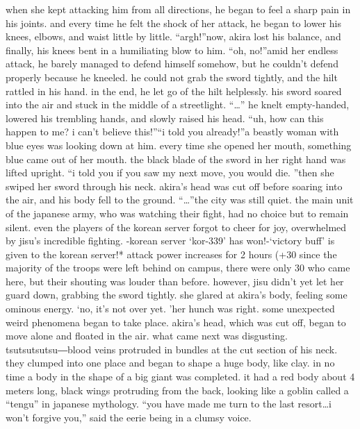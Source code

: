  when she kept attacking him from all directions, he began to feel a sharp pain in his joints.
and every time he felt the shock of her attack, he began to lower his knees, elbows, and waist little by little.
“argh!”now, akira lost his balance, and finally, his knees bent in a humiliating blow to him.
“oh, no!”amid her endless attack, he barely managed to defend himself somehow, but he couldn’t defend properly because he kneeled.
 he could not grab the sword tightly, and the hilt rattled in his hand.
in the end, he let go of the hilt helplessly.
 his sword soared into the air and stuck in the middle of a streetlight.
“…”
he knelt empty-handed, lowered his trembling hands, and slowly raised his head.
“uh, how can this happen to me? i can’t believe this!”“i told you already!”a beastly woman with blue eyes was looking down at him.
 every time she opened her mouth, something blue came out of her mouth.
 the black blade of the sword in her right hand was lifted upright.
“i told you if you saw my next move, you would die.
”then she swiped her sword through his neck.
akira’s head was cut off before soaring into the air, and his body fell to the ground.
“…”the city was still quiet.
 the main unit of the japanese army, who was watching their fight, had no choice but to remain silent.
even the players of the korean server forgot to cheer for joy, overwhelmed by jisu’s incredible fighting.
-korean server ‘kor-339’ has won!-‘victory buff’ is given to the korean server!* attack power increases for 2 hours (+30%
since the majority of the troops were left behind on campus, there were only 30 who came here, but their shouting was louder than before.
however, jisu didn’t yet let her guard down, grabbing the sword tightly.
she glared at akira’s body, feeling some ominous energy.
‘no, it’s not over yet.
’her hunch was right.
 some unexpected weird phenomena began to take place.
akira’s head, which was cut off, began to move alone and floated in the air.
what came next was disgusting.
tsutsutsutsu―blood veins protruded in bundles at the cut section of his neck.
 they clumped into one place and began to shape a huge body, like clay.
in no time a body in the shape of a big giant was completed.
it had a red body about 4 meters long, black wings protruding from the back, looking like a goblin called a “tengu” in japanese mythology.
“you have made me turn to the last resort…i won’t forgive you,” said the eerie being in a clumsy voice.
